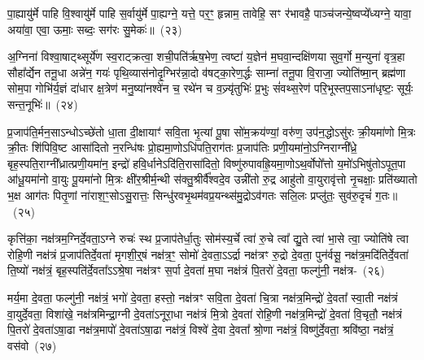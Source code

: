 पा॒ह्यायु॑र्मे पाहि वि॒श्वायु॑र्मे पाहि स॒र्वायु॑र्मे पा॒ह्यग्ने॒ यत्ते॒ पर॒ꣳ॒ हृन्नाम॒ तावेहि॒ सꣳ र॑भावहै॒ पाञ्च॑जन्ये॒ष्वप्ये᳚ध्यग्ने॒ यावा॒ अया॑वा॒ एवा॒ ऊमाः॒ सब्दः॒ सग॑रः सु॒मेकः॑॥~(२३)

{\anuvakamend[{व्या॒नं मे॒ द्वात्रिꣳ॑शच्च}]}%

अ॒ग्निना॑ विश्वा॒षाट्थ्सूर्ये॑ण स्व॒राट्क्रत्वा॒ शची॒पति॑र्\mbox{}ऋष॒भेण॒ त्वष्टा॑ य॒ज्ञेन॑ म॒घवा॒न्दक्षि॑णया सुव॒र्गो म॒न्युना॑ वृत्र॒हा सौहा᳚र्द्येन तनू॒धा अन्ने॑न॒ गयः॑ पृथि॒व्यास॑नोदृ॒ग्भिर॑न्ना॒दो व॑षट्का॒रेण॒र्द्धः साम्ना॑ तनू॒पा वि॒राजा॒ ज्योति॑ष्मा॒न् ब्रह्म॑णा सोम॒पा गोभि॑र्य॒ज्ञं दा॑धार क्ष॒त्रेण॑ मनु॒ष्या॑नश्वे॑न च॒ रथे॑न च व॒ज्र्यृ॑तुभिः॑ प्र॒भुः सं॑वथ्स॒रेण॑ परि॒भूस्तप॒सा\-ऽ\-ना॑धृष्टः॒ सूर्यः॒ सन्त॒नूभिः॑॥~(२४)

{\anuvakamend[{अ॒ग्निनैका॒न्नप॑ञ्चा॒शत्}]}%

प्र॒जा\-प॑ति॒र्मन॒सा\-ऽ\-न्धो\-ऽच्छे॑तो धा॒ता दी॒क्षायाꣳ॑ सवि॒ता भृ॒त्यां पू॒षा सो॑म॒क्रय॑ण्यां॒ वरु॑ण॒ उप॑न॒द्धो\-ऽसु॑रः क्री॒यमा॑णो मि॒त्रः क्री॒तः शि॑पिवि॒ष्ट आसा॑दितो न॒रन्धि॑षः प्रो॒ह्यमा॒णो\-ऽधि॑\-पति॒राग॑तः प्र॒जा\-प॑तिः प्रणी॒यमा॑नो॒\-ऽग्निराग्नी᳚ध्रे॒ बृह॒स्पति॒राग्नी᳚ध्रात्प्रणी॒यमा॑न॒ इन्द्रो॑ हवि॒र्धाने\-ऽदि॑ति॒रासा॑दितो॒ विष्णु॑रुपावह्रि॒यमा॒णो\-ऽथ॒र्वोपो᳚त्तो य॒मो॑\-ऽभिषु॑तो\-ऽपूत॒पा आ॑धू॒यमा॑नो वा॒युः पू॒यमा॑नो मि॒त्रः क्षी॑र॒श्रीर्म॒न्थी स॑क्तु॒श्रीर्वै᳚श्वदे॒व उन्नी॑तो रु॒द्र आहु॑तो वा॒युरावृ॑त्तो नृ॒चक्षाः॒ प्रति॑ख्यातो भ॒क्ष आग॑तः पितृ॒णां ना॑राश॒ꣳ॒सो\-ऽसु॒रात्तः॒ सिन्धु॑रवभृ॒थम॑वप्र॒यन्थ्स॑मु॒द्रो\-ऽव॑गतः सलि॒लः प्रप्लु॑तः॒ सुव॑रु॒दृचं॑ ग॒तः॥~(२५)

{\anuvakamend[{रु॒द्र एक॑विꣳशतिश्च}]}%

कृत्ति॑का॒ नक्ष॑त्रम॒ग्निर्दे॒वता॒ऽग्ने रुचः॑ स्थ प्र॒जा\-प॑तेर्धा॒तुः सोम॑स्य॒र्चे त्वा॑ रु॒चे त्वा᳚ द्यु॒ते त्वा॑ भा॒से त्वा॒ ज्योति॑षे त्वा रोहि॒णी नक्ष॑त्रं प्र॒जा\-प॑तिर्दे॒वता॑ मृगशी॒र्॒\mbox{}षं नक्ष॑त्र॒ꣳ॒ सोमो॑ दे॒वता॒ऽऽर्द्रा नक्ष॑त्रꣳ रु॒द्रो दे॒वता॒ पुन॑र्वसू॒ नक्ष॑त्र॒मदि॑ति\-र्दे॒वता॑ ति॒ष्यो॑ नक्ष॑त्रं॒ बृह॒स्पति॑र्दे॒वता᳚ऽऽश्रे॒षा नक्ष॑त्रꣳ स॒र्पा दे॒वता॑ म॒घा नक्ष॑त्रं पि॒तरो॑ दे॒वता॒ फल्गु॑नी॒ नक्ष॑त्र-~(२६)

मर्य॒मा दे॒वता॒ फल्गु॑नी॒ नक्ष॑त्रं॒ भगो॑ दे॒वता॒ हस्तो॒ नक्ष॑त्रꣳ सवि॒ता दे॒वता॑ चि॒त्रा नक्ष॑त्र॒मिन्द्रो॑ दे॒वता᳚ स्वा॒ती नक्ष॑त्रं वा॒युर्दे॒वता॒ विशा॑खे॒ नक्ष॑त्रमिन्द्रा॒ग्नी दे॒वता॑\-ऽनूरा॒धा नक्ष॑त्रं मि॒त्रो दे॒वता॑ रोहि॒णी नक्ष॑त्र॒मिन्द्रो॑ दे॒वता॑ वि॒चृतौ॒ नक्ष॑त्रं पि॒तरो॑ दे॒वता॑ऽषा॒ढा नक्ष॑त्र॒मापो॑ दे॒वता॑ऽषा॒ढा नक्ष॑त्रं॒ विश्वे॑ दे॒वा दे॒वता᳚ श्रो॒णा नक्ष॑त्रं॒ विष्णु॑र्दे॒वता॒ श्रवि॑ष्ठा॒ नक्ष॑त्रं॒ वस॑वो~(२७)

